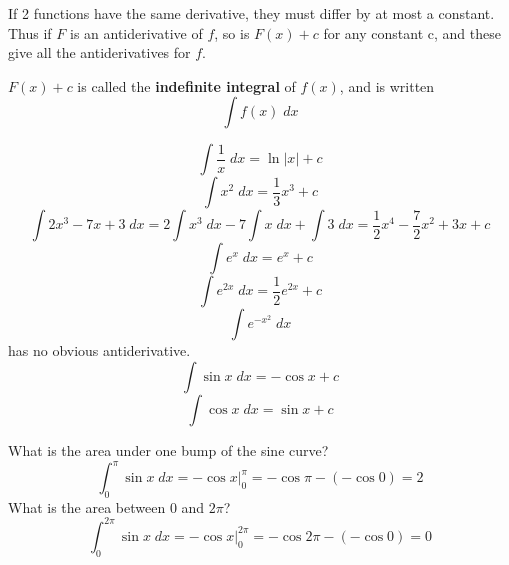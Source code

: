 \documentclass{article}
\begin{document}
  \begin{remark}
    If 2 functions have the same derivative, they must differ by at most a constant. Thus if $F$ is an antiderivative of $f$, so is $F(x) + c$ for any constant c, and these give all the antiderivatives for $f$.
  \end{remark}
  \begin{definition}
    $F(x) + c$ is called the \textbf{indefinite integral} of $f(x)$, and is written \[
      \int f(x) \; dx
    \]
  \end{definition}
  \begin{example}
    \[
      \int \frac{1}{x} \; dx = \ln |x| + c
    \]
    \[
      \int x^2 \; dx = \frac{1}{3}x^3 + c
    \]
    \[
      \int 2x^3 -7x + 3 \; dx = 2\int x^3 \; dx - 7\int x \; dx + \int 3 \; dx = \frac{1}{2}x^4 - \frac{7}{2}x^2 + 3x + c
    \]
    \[
      \int e^x \; dx = e^x + c
    \]
    \[
      \int e^{2x} \; dx = \frac{1}{2}e^{2x} + c
    \]
    \[
      \int e^{-x^2} \; dx
    \] has no obvious antiderivative.
    \[
      \int \sin x \; dx = - \cos x + c
    \]
    \[
      \int \cos x \; dx = \sin x + c
    \]
  \end{example}
  \begin{example}
    What is the area under one bump of the sine curve?
    \[
      \int_0^\pi \sin x \; dx = -\cos x \Big|_0^\pi = - \cos \pi - (-\cos 0) = 2
    \]
    What is the area between $0$ and $2\pi$?
    \[
      \int_0^{2\pi} \sin x \; dx = -\cos x\Big|_0^{2\pi} = -\cos 2\pi - (-\cos 0) = 0
    \]
  \end{example}
\end{document}
